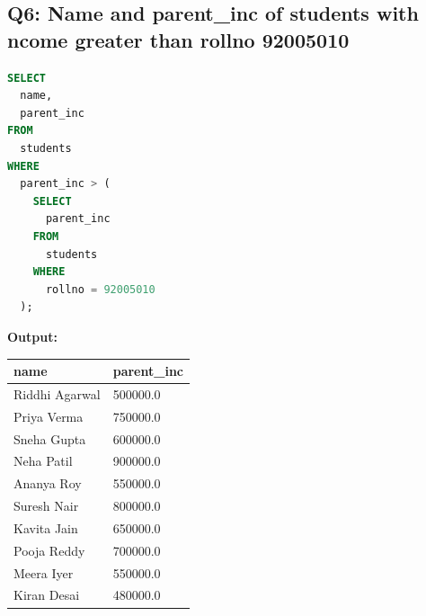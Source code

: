 \documentclass[11pt, a4paper]{article}
\begin{document}
\subsection*{Q6: Name and parent\_inc of students with ncome greater than rollno 92005010}
\begin{lstlisting}[language=SQL]
SELECT
  name,
  parent_inc
FROM
  students
WHERE
  parent_inc > (
    SELECT
      parent_inc
    FROM
      students
    WHERE
      rollno = 92005010
  );
\end{lstlisting}
\vspace{0.3cm}
\textbf{Output:}\vspace{0.2cm}
\begin{center}
\begin{tabular}{|l|l|}
\hline
\textbf{name} & \textbf{parent\_inc} \\ \hline
Riddhi Agarwal                 & 500000.0 \\ \hline
Priya Verma                    & 750000.0 \\ \hline
Sneha Gupta                    & 600000.0 \\ \hline
Neha Patil                     & 900000.0 \\ \hline
Ananya Roy                     & 550000.0 \\ \hline
Suresh Nair                    & 800000.0 \\ \hline
Kavita Jain                    & 650000.0 \\ \hline
Pooja Reddy                    & 700000.0 \\ \hline
Meera Iyer                     & 550000.0 \\ \hline
Kiran Desai                    & 480000.0 \\ \hline
\end{tabular}
\end{center}
\newpage
\end{document}
